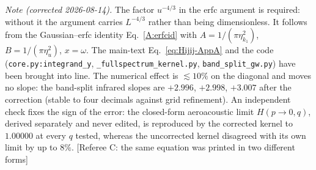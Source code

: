 \documentclass[10pt,prd,aps,nobibnotes,superscriptaddress,preprintnumbers,notitlepage]{revtex4-1}
\newcommand{\add}[1]{{\color{red}#1}}
\newcommand{\why}[1]{{\color{red}\footnotesize\textsf{[#1]}}}
\newcommand{\add}[1]{#1}
\newcommand{\why}[1]{}
\begin{document}
\add{\noindent\emph{Note (corrected 2026-08-14).} The factor $u^{-4/3}$ in the erfc
argument is required: without it the argument carries $L^{-4/3}$ rather than being
dimensionless. It follows from the Gaussian--erfc identity Eq.~\eqref{A:erfcid} with
$A=1/(\pi\eta_{k_1}^{2})$, $B=1/(\pi\eta_u^{2})$, $x=\omega$. The main-text
Eq.~\eqref{eq:Hijij-AppA} and the code (\texttt{core.py:integrand\_y},
\texttt{\_fullspectrum\_kernel.py}, \texttt{band\_split\_gw.py}) have been brought into
line. The numerical effect is $\lesssim10\%$ on the diagonal and moves no slope: the
band-split infrared slopes are $+2.996$, $+2.998$, $+3.007$ after the correction
(stable to four decimals against grid refinement). An independent check fixes the sign of
the error: the closed-form aeroacoustic limit $H(p\to0,q)$, derived separately and never
edited, is reproduced by the corrected kernel to $1.00000$ at every $q$ tested, whereas
the uncorrected kernel disagreed with its own limit by up to $8\%$.}
\why{Referee C: the same equation was printed in two different forms}
\end{document}
